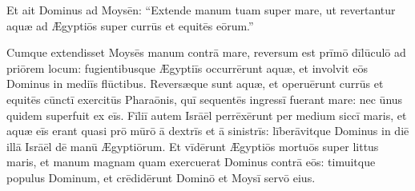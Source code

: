 Et ait Dominus ad Moysēn: ``Extende manum tuam
super mare, ut revertantur aquæ ad Ægyptiōs super currūs et equitēs
eōrum.''

Cumque extendisset Moysēs manum contrā mare, reversum est prīmō
dīlūculō ad priōrem locum: fugientibusque
Ægyptiīs occurrērunt aquæ, et involvit eōs Dominus in
mediīs flūctibus. Reversæque sunt aquæ, et operuērunt currūs et equitēs
cūnctī exercitūs Pharaōnis, quī sequentēs ingressī fuerant mare: nec ūnus
quidem superfuit ex eīs. Fīliī autem Isrāēl perrēxērunt per medium siccī
maris, et aquæ eīs erant quasi prō mūrō ā dextrīs et ā sinistrīs: 
līberāvitque Dominus in diē illā Isrāēl dē manū Ægyptiōrum. 
Et vīdērunt
Ægyptiōs mortuōs super littus maris, et manum magnam quam
exercuerat Dominus contrā eōs: timuitque populus Dominum, et crēdidērunt
Dominō et Moysī servō eius.
